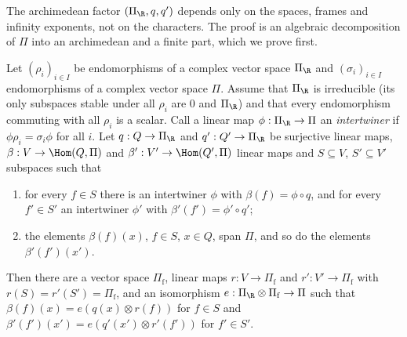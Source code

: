 The archimedean factor $(\Pi_\R,q,q')$ depends only on the spaces, frames and infinity exponents, not on the characters.
The proof is an algebraic decomposition of $\Pi$ into an archimedean and a finite part, which we prove first.

\begin{lemma}\label{pf:sh-theta:productform}
Let $(\rho_i)_{i\in I}$ be endomorphisms of a complex vector space $\Pi_\R$ and $(\sigma_i)_{i\in I}$ endomorphisms of a complex
vector space $\Pi$. Assume that $\Pi_\R$ is irreducible (its only subspaces stable under all $\rho_i$ are $0$ and $\Pi_\R$) and
that every endomorphism commuting with all $\rho_i$ is a scalar. Call a linear map $\phi:\Pi_\R\to\Pi$ an \emph{intertwiner}
if $\phi\rho_i=\sigma_i\phi$ for all $i$. Let $q:Q\to\Pi_\R$ and $q':Q'\to\Pi_\R$ be surjective linear maps,
$\beta:V\to\Hom(Q,\Pi)$ and $\beta':V'\to\Hom(Q',\Pi)$ linear maps and $S\subseteq V$, $S'\subseteq V'$ subspaces such that
\begin{enumerate}[label=(\roman*)]
\item for every $f\in S$ there is an intertwiner $\phi$ with $\beta(f)=\phi\circ q$, and for every $f'\in S'$ an intertwiner
$\phi'$ with $\beta'(f')=\phi'\circ q'$;
\item the elements $\beta(f)(x)$, $f\in S$, $x\in Q$, span $\Pi$, and so do the elements $\beta'(f')(x')$.
\end{enumerate}
Then there are a vector space $\Pi_{\mathrm f}$, linear maps $r:V\to\Pi_{\mathrm f}$ and $r':V'\to\Pi_{\mathrm f}$ with
$r(S)=r'(S')=\Pi_{\mathrm f}$, and an isomorphism $e:\Pi_\R\otimes\Pi_{\mathrm f}\to\Pi$ such that
$\beta(f)(x)=e(q(x)\otimes r(f))$ for $f\in S$ and $\beta'(f')(x')=e(q'(x')\otimes r'(f'))$ for $f'\in S'$.
\end{lemma}

